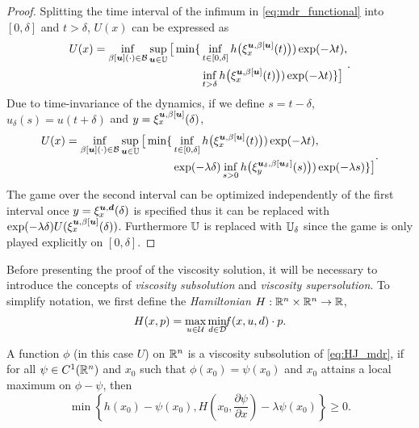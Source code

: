 \begin{for_journal}
\begin{proof}
Splitting the time interval of the infimum in \eqref{eq:mdr_functional} into $[0,\delta]$ and $t>\delta$, $U(x)$ can be expressed as
%
\begin{equation}
\begin{split}{}{}{}
U(x) =
\inf_{\beta[\bm{u}](\cdot) \in \mathcal{B}} \sup_{\bm{u} \in \mathbb{U}} 
\big [\min\{&\inf_{t \in [0, \delta]} h\big(\xi_{x}^{\bm{u},\beta[\bm{u}]}(t)\big))\exp(-\lambda  t),\\ &\inf_{t > \delta} h\big(\xi_{x}^{\bm{u},\beta[\bm{u}]}(t)\big))\exp(-\lambda  t)\}
\big ]
\end{split}.
\end{equation}
%
Due to time-invariance of the dynamics, if we define $s=t-\delta$, $u_\delta(s)=u(t+\delta)$ and $y=\xi_{x}^{\bm{u},\beta[\bm{u}]}(\delta)$,
%
\begin{equation}
\begin{split}
U(x) = 
\inf_{\beta[\bm{u}](\cdot) \in \mathcal{B}} \sup_{\bm{u} \in \mathbb{U}} 
\big [\min\{&\inf_{t \in [0, \delta]} h\big(\xi_{x}^{\bm{u},\beta[\bm{u}]}(t)\big))\exp(-\lambda  t), \\ &\exp(-\lambda \delta) \inf_{s > 0} h\big(\xi_{y}^{\bm{u}_\delta,\beta[\bm{u}_\delta]}(s)\big))\exp(-\lambda s)\}
\big ]
\end{split}.
\end{equation}
%
The game over the second interval can be optimized independently of the first interval once $y=\xi_{x}^{\bm{u},\bm{d}}(\delta)$ is specified thus it can be replaced with $\exp(-\lambda \delta)U(\xi_{x}^{\bm{u},\beta[\bm{u}]}(\delta))$. Furthermore $\mathbb{U}$ is replaced with $\mathbb{U}_\delta$ since the game is only played explicitly on $[0,\delta]$.
\end{proof}

Before presenting the proof of the viscosity solution, it will be necessary to introduce the concepts of \emph{viscosity subsolution} and \emph{viscosity supersolution}. To simplify notation, we first define the \emph{Hamiltonian} $H:\mathbb{R}^n \times \mathbb{R}^n \rightarrow \mathbb{R}$,
%
\begin{equation}\label{eq:hamiltonian}
H(x,p) = \max_{u\in\mathcal{U}} \min_{ d\in\mathcal{D}} \!\! f(x,u,d)\cdot p.
\end{equation}

\begin{definition} A function $\phi$ (in this case $U$) on $\mathbb{R}^n$  is a viscosity subsolution of \eqref{eq:HJ_mdr}, if for all $\psi \in C^1(\mathbb{R}^n)$ and $x_0$ such that $\phi(x_0) = \psi(x_0)$ and $x_0$ attains a local maximum on $\phi- \psi$, then
%
\begin{equation}\label{eq:sub_sol}
    \min\left\{h(x_0)-\psi(x_0), H(x_0,\frac{\partial \psi}{\partial x}) - \lambda \psi(x_0)\right\} \geq 0.
\end{equation}
\end{definition}
%


\end{for_journal}
